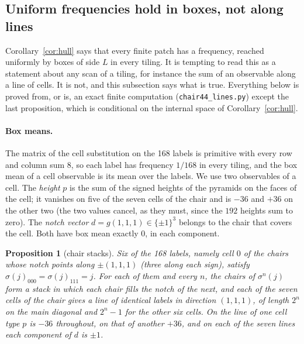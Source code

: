 \documentclass[11pt]{article}
\newtheorem{prop}{Proposition}
\theoremstyle{definition}
\theoremstyle{remark}
\newcommand{\code}[1]{\texttt{#1}}
\begin{document}
\subsection{Uniform frequencies hold in boxes, not along lines}
\label{sec:lines}

Corollary~\ref{cor:hull} says that every finite patch has a frequency, reached uniformly by boxes of side $L$ in every
tiling.  It is tempting to read this as a statement about any scan of a tiling, for instance the sum of an observable
along a line of cells.  It is not, and this subsection says what is true.  Everything below is proved from, or is, an exact finite computation
(\code{chair44\_lines.py}) except the last proposition, which is conditional on the internal space of
Corollary~\ref{cor:hull}.

\paragraph{Box means.}  The matrix of the cell substitution on the 168 labels is primitive with every row and column
sum $8$, so each label has frequency $1/168$ in every tiling, and the box mean of a cell observable is its mean over
the labels.  We use two observables of a cell.  The \emph{height} $p$ is the sum of the signed heights of the pyramids on the
faces of the cell; it vanishes on five of the seven cells of the chair and is $-36$ and $+36$ on the other two (the two
values cancel, as they must, since the $192$ heights sum to zero).  The \emph{notch vector} $d=g(1,1,1)\in\{\pm1\}^{3}$ belongs to the chair that covers the cell.  Both have box
mean exactly $0$, in each component.

\begin{prop}[chair stacks]
\label{prop:stack}
Six of the 168 labels, namely cell $0$ of the chairs whose notch points along $\pm(1,1,1)$ (three along each sign), satisfy
$\sigma(j)_{000}=\sigma(j)_{111}=j$.  For each of them and every $n$, the chairs of $\sigma^{n}(j)$ form a stack in which each
chair fills the notch of the next, and each of the seven cells of the chair gives a line of identical labels in direction
$(1,1,1)$, of length $2^{n}$ on the main diagonal and $2^{n}-1$ for the other six cells.  On the line of one cell type $p$ is
$-36$ throughout, on that of another $+36$, and on each of the seven lines each component of $d$ is $\pm1$.
\end{prop}
\end{document}
